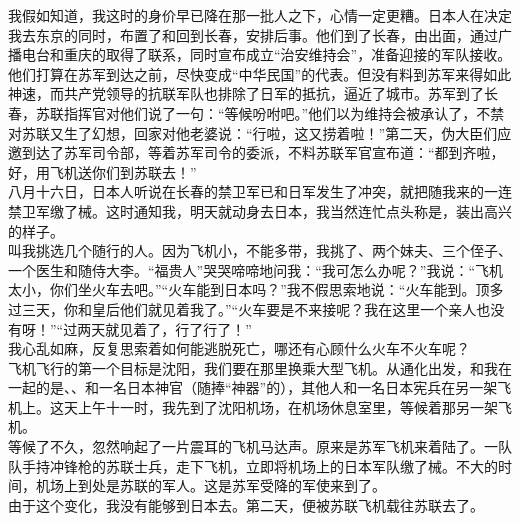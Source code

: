 我假如知道，我这时的身价早已降在那一批人之下，心情一定更糟。日本人在决定我去东京的同时，布置了和回到长春，安排后事。他们到了长春，由出面，通过广播电台和重庆的取得了联系，同时宣布成立“治安维持会”，准备迎接的军队接收。他们打算在苏军到达之前，尽快变成“中华民国”的代表。但没有料到苏军来得如此神速，而共产党领导的抗联军队也排除了日军的抵抗，逼近了城市。苏军到了长春，苏联指挥官对他们说了一句：“等候吩咐吧。”他们以为维持会被承认了，不禁对苏联又生了幻想，回家对他老婆说：“行啦，这又捞着啦！”第二天，伪大臣们应邀到达了苏军司令部，等着苏军司令的委派，不料苏联军官宣布道：“都到齐啦，好，用飞机送你们到苏联去！”\\

八月十六日，日本人听说在长春的禁卫军已和日军发生了冲突，就把随我来的一连禁卫军缴了械。这时通知我，明天就动身去日本，我当然连忙点头称是，装出高兴的样子。\\

叫我挑选几个随行的人。因为飞机小，不能多带，我挑了、两个妹夫、三个侄子、一个医生和随侍大李。“福贵人”哭哭啼啼地问我：“我可怎么办呢？”我说：“飞机太小，你们坐火车去吧。”“火车能到日本吗？”我不假思索地说：“火车能到。顶多过三天，你和皇后他们就见着我了。”“火车要是不来接呢？我在这里一个亲人也没有呀！”“过两天就见着了，行了行了！”\\

我心乱如麻，反复思索着如何能逃脱死亡，哪还有心顾什么火车不火车呢？\\

飞机飞行的第一个目标是沈阳，我们要在那里换乘大型飞机。从通化出发，和我在一起的是、、和一名日本神官（随捧“神器”的），其他人和一名日本宪兵在另一架飞机上。这天上午十一时，我先到了沈阳机场，在机场休息室里，等候着那另一架飞机。\\

等候了不久，忽然响起了一片震耳的飞机马达声。原来是苏军飞机来着陆了。一队队手持冲锋枪的苏联士兵，走下飞机，立即将机场上的日本军队缴了械。不大的时间，机场上到处是苏联的军人。这是苏军受降的军使来到了。\\

由于这个变化，我没有能够到日本去。第二天，便被苏联飞机载往苏联去了。
